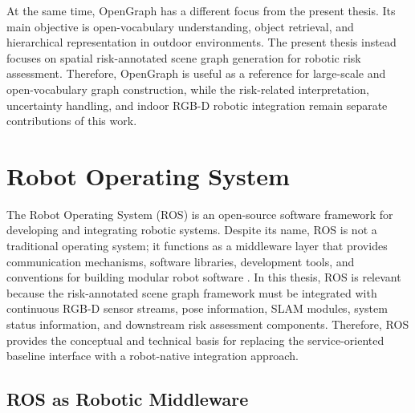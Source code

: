 {At the same time, OpenGraph has a different focus from the present thesis. Its main objective is open-vocabulary understanding, object retrieval, and hierarchical representation in outdoor environments. The present thesis instead focuses on spatial risk-annotated scene graph generation for robotic risk assessment. Therefore, OpenGraph is useful as a reference for large-scale and open-vocabulary graph construction, while the risk-related interpretation, uncertainty handling, and indoor RGB-D robotic integration remain separate contributions of this work.

}

















\iffalse
\section{Robot Operating System}

{\small

The Robot Operating System (ROS) is an open-source software framework for developing and integrating robotic systems. Despite its name, ROS is not a traditional operating system; it functions as a middleware layer that provides communication mechanisms, software libraries, development tools, and conventions for building modular robot software \cite{quigley2009ros}. In this thesis, ROS is relevant because the risk-annotated scene graph framework must be integrated with continuous RGB-D sensor streams, pose information, SLAM modules, system status information, and downstream risk assessment components. Therefore, ROS provides the conceptual and technical basis for replacing the service-oriented baseline interface with a robot-native integration approach.

}

\subsection{ROS as Robotic Middleware}


